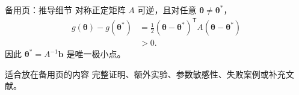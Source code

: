 \documentclass[aspectratio=169,11pt]{beamer}
\newcommand{\vect}[1]{\bm{#1}}
\begin{document}
\appendix

\begin{frame}{备用页：推导细节}
  对称正定矩阵 $A$ 可逆，且对任意 $\vect{\theta}\neq\vect{\theta}^{*}$，
  \begin{align*}
    g(\vect{\theta})-g(\vect{\theta}^{*})
      &= \frac{1}{2}(\vect{\theta}-\vect{\theta}^{*})^{\mathsf T}
           A(\vect{\theta}-\vect{\theta}^{*})\\
      &>0.
  \end{align*}
  \vspace{0.2cm}
  因此 $\vect{\theta}^{*}=A^{-1}\vect{b}$ 是唯一极小点。
  \vspace{0.3cm}
  \begin{exampleblock}{适合放在备用页的内容}
    完整证明、额外实验、参数敏感性、失败案例或补充文献。
  \end{exampleblock}
\end{frame}

%
\end{document}
